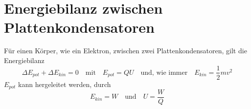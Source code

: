 \documentclass{article}
\begin{document}
 
\section{Energiebilanz zwischen Plattenkondensatoren}
Für einen Körper, wie ein Elektron, zwischen zwei Plattenkondensatoren, gilt die Energiebilanz
\[
 \Delta E_{pot} + \Delta E_{kin} = 0
 \quad \text{mit} \quad
 E_{pot} = QU
 \quad \text{und, wie immer} \quad
 E_{kin} = \frac{1}{2} mv^2
\] 
$E_{pot}$ kann hergeleitet werden, durch 
\[
 E_{kin} = W
 \quad \text{und} \quad
 U = \frac{W}{Q} 
\]
\end{document}
